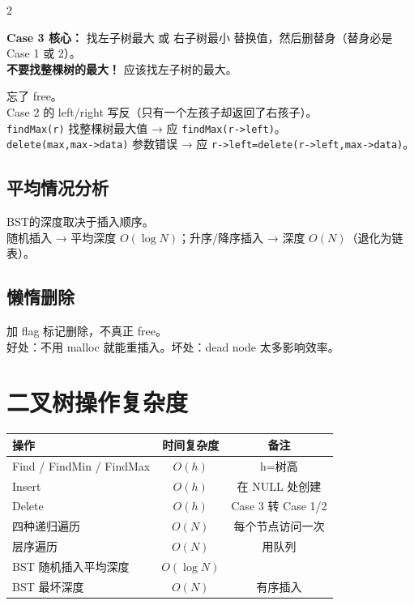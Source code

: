 \documentclass[10pt,a4paper]{article}
\begin{document}
\begin{multicols}{2}
\begin{keybox}
\textbf{Case 3 核心：} 找左子树最大 或 右子树最小 替换值，然后删替身（替身必是 Case 1 或 2）。\\
\textbf{不要找整棵树的最大！} 应该找左子树的最大。
\end{keybox}

\begin{bugbox}
忘了 free。\\
Case 2 的 left/right 写反（只有一个左孩子却返回了右孩子）。\\
\texttt{findMax(r)} 找整棵树最大值 → 应 \texttt{findMax(r->left)}。\\
\texttt{delete(max,max->data)} 参数错误 → 应 \texttt{r->left=delete(r->left,max->data)}。
\end{bugbox}

\subsection*{平均情况分析}

BST的深度取决于插入顺序。\\
随机插入 → 平均深度 $O(\log N)$；升序/降序插入 → 深度 $O(N)$（退化为链表）。

\subsection*{懒惰删除}

加 flag 标记删除，不真正 free。\\
好处：不用 malloc 就能重插入。坏处：dead node 太多影响效率。

\end{multicols}

\section*{二叉树操作复杂度}

{\small
\begin{tabular}{|l|c|c|}
\hline
\textbf{操作} & \textbf{时间复杂度} & \textbf{备注} \\
\hline
Find / FindMin / FindMax & $O(h)$ & h=树高 \\
Insert & $O(h)$ & 在 NULL 处创建 \\
Delete & $O(h)$ & Case 3 转 Case 1/2 \\
四种递归遍历 & $O(N)$ & 每个节点访问一次 \\
层序遍历 & $O(N)$ & 用队列 \\
BST 随机插入平均深度 & $O(\log N)$ & \\
BST 最坏深度 & $O(N)$ & 有序插入 \\
\hline
\end{tabular}
}
\end{document}
